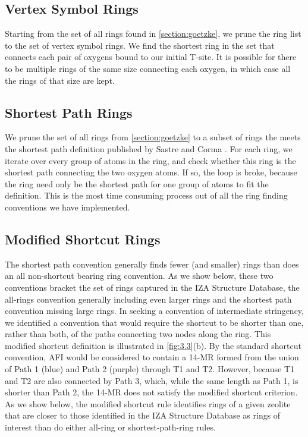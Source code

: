 \documentclass[preprint,numrefs,noinfo,sort&compress]{elsarticle}
\begin{document}
\subsection{Vertex Symbol Rings \label{section:vertex}}
\label{sec:org415adcd}

Starting from the set of all rings found in \cref{section:goetzke}, we prune the ring list to the set of vertex symbol rings. We find the shortest ring in the set that connects each pair of oxygens bound to our initial T-site. It is possible for there to be multiple rings of the same size connecting each oxygen, in which case all the rings of that size are kept. 

\subsection{Shortest Path Rings}
\label{sec:org6be3a64}

We prune the set of all rings from \cref{section:goetzke} to a subset of rings the meets the shortest path definition published by Sastre and Corma \cite{sastre-topological-2009}. For each ring, we iterate over every group of  atoms in the ring, and check whether this ring is the shortest path connecting the two oxygen atoms. If so, the loop is broke, because the ring need only be the shortest path for one group of  atoms to fit the definition. This is the most time consuming process out of all the ring finding conventions we have implemented.

\subsection{Modified Shortcut Rings \label{section:modified}}
\label{sec:org9232478}
The shortest path convention generally finds fewer (and smaller) rings than does an all non-shortcut bearing ring convention. As we show below, these two conventions bracket the set of rings captured in the IZA Structure Database, the all-rings convention generally including even larger rings and the shortest path convention missing large rings.
In seeking a convention of intermediate stringency, we identified a convention that would require the shortcut to be shorter than one, rather than both, of the paths connecting two nodes along the ring. This modified shortcut definition is illustrated in \cref{fig:3.3}(b).  By the standard shortcut convention, AFI would be considered to contain a 14-MR formed from the union of Path 1 (blue) and Path 2 (purple) through T1 and T2. However, because T1 and T2 are also connected by Path 3, which, while the same length as Path 1, is shorter than Path 2, the 14-MR does not satisfy the modified shortcut criterion. As we show below, the modified shortcut rule identifies rings of a given zeolite that are closer to those identified in the IZA Structure Database as rings of interest than do either all-ring or shortest-path-ring rules. 
\end{document}

